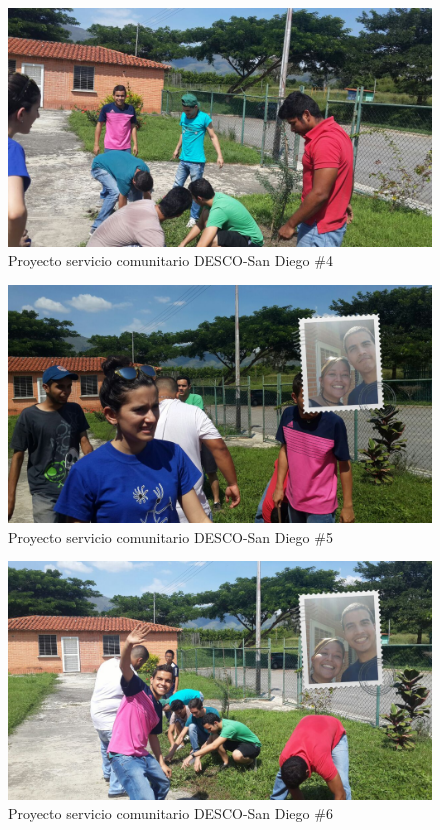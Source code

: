 \documentclass[11pt, a4paper, twosides]{report}
\begin{document}
\begin{figure}[h]
    \centering
    \includegraphics[width=1\linewidth]{6.jpg}
    \caption{Proyecto servicio comunitario DESCO-San Diego \#4}
    \label{fig:6}
\end{figure}

\begin{figure}[h]
    \centering
    \includegraphics[width=1\linewidth]{7.jpg}
    \caption{Proyecto servicio comunitario DESCO-San Diego \#5}
    \label{fig:7}
\end{figure}

\begin{figure}[h]
    \centering
    \includegraphics[width=1\linewidth]{8.jpg}
    \caption{Proyecto servicio comunitario DESCO-San Diego \#6}
    \label{fig:8}
\end{figure}
\end{document}

